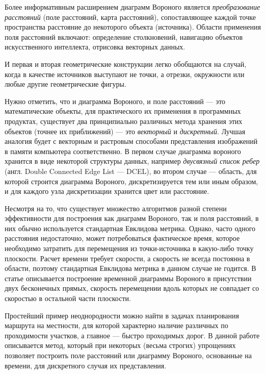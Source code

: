 \documentclass[12pt]{article}
\begin{document}
Более информативным расширением диаграмм Вороного является \emph{преобразование 
расстояний} (поле расстояний, карта расстояний), сопоставляющее каждой точке 
пространства расстояние до некоторого объекта (источника). Области применения 
поля расстояний включают: определение столкновений, навигацию объектов 
искусственного интеллекта, отрисовка векторных данных.

И первая и вторая геометрические конструкции легко обобщаются на случай, когда 
в качестве источников выступают не точки, а отрезки, окружности или любые другие
геометрические фигуры.

Нужно отметить, что и диаграмма Вороного, и поле расстояний --- это 
математические объекты, для практического их применения в программных 
продуктах, существует два принципиально различных метода хранения этих
объектов (точнее их приближений) --- это \emph{векторный} и \emph{дискретный}.
Лучшая аналогия будет с векторным и растровым способами представления 
изображений в памяти компьютера соответственно. В первом случае 
диаграмма вороного хранится в виде некоторой структуры данных, например 
\emph{двусвязный список ребер} (англ. Double Connected Edge List --- DCEL),
во втором случае --- область, для которой строится диаграмма Вороного, 
дискретизируется тем или иным образом, и для каждого узла дискретизации хранится
цвет или расстояние.

Несмотря на то, что существует множество алгоритмов разной степени 
эффективности для построения как диаграмм Вороного, так и поля расстояний,
в них обычно используется стандартная Евклидова метрика. Однако, часто одного
расстояния недостаточно, может потребоваться фактическое время, которое 
необходимо затратить для перемещения из точки-источника в какую-либо точку
плоскости. Расчет времени требует скорости, а скорость не всегда постоянна
в области, поэтому стандартная Евклидова метрика в данном случае не годится.
В статье \cite{timeb} описывается построение временной 
диаграммы Вороного в присутствии двух бесконечных прямых, скорость перемещении
вдоль которых не совпадает со скоростью в остальной части плоскости.

Простейший пример неоднородности можно найти в задачах планирования маршрута
на местности, для которой характерно наличие различных по проходимости участков,
а главное --- быстро проходимых дорог. В данной работе описывается метод, 
который при некоторых (весьма строгих) упрощениях позволяет построить 
поле расстояний или диаграмму Вороного, основанные на времени,
для дискретного случая их представления.
\end{document}
